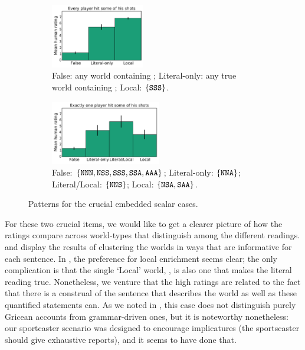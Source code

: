 \documentclass[leqno]{article}
\begin{document}
\begin{figure}[t]
  \centering
  \begin{subfigure}{0.47\textwidth}  
    \centering
    \includegraphics[height=2.8cm]{fig/every-some}
    \caption{False: any world containing ; 
      Literal-only: any true world containing ; 
      Local: $\left\{ \texttt{SSS} \right\}$.}
    \label{fig:crucial-every}
  \end{subfigure}
  \hfill
  \begin{subfigure}{0.47\textwidth}
    \centering
    \includegraphics[height=2.8cm]{fig/exactlyone-some}    
    \caption{False: $\left\{ \texttt{NNN}, \texttt{NSS}, \texttt{SSS}, \texttt{SSA}, \texttt{AAA} \right\}$;
      Literal-only: $\left\{ \texttt{NNA} \right\}$;
      Literal/Local: $\left\{ \texttt{NNS} \right\}$;
      Local: $\left\{ \texttt{NSA}, \texttt{SAA} \right\}$.}
    \label{fig:crucial-exactlyone}
    \end{subfigure}
    \caption{Patterns for the crucial embedded scalar cases.}
    \label{fig:crucial}
\end{figure}


For these two crucial items, we would like to get a clearer picture of
how the ratings compare across world-types that distinguish among the
different readings.  and
 display the results of clustering the
worlds in ways that are informative for each sentence. In
, the preference for local enrichment seems
clear; the only complication is that the single `Local' world,
, is also one that makes the literal reading
true. Nonetheless, we venture that the high ratings are related to the
fact that there is a construal of the sentence that describes the
world as well as these quantified statements can. As we noted in
, this case does not distinguish purely
Gricean accounts from grammar-driven ones, but it is noteworthy
nonetheless: our sportcaster scenario was designed to encourage
implicatures (the sportscaster should give exhaustive reports), and it
seems to have done that.
\end{document}
